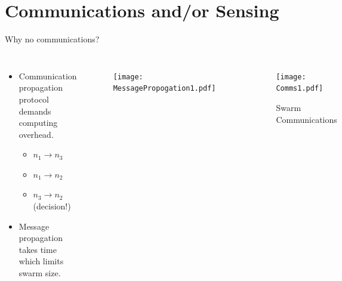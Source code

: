 \documentclass{beamer}
\begin{document}
\section{Communications and/or Sensing}
\begin{frame}{Why no communications?}
  
  \begin{columns}
      \begin{itemize}
        \item {
          Communication propagation protocol demands computing overhead.
          \begin{itemize}
            \item $n_1 \rightarrow n_3$
            \item $n_1 \rightarrow n_2$
            \item $n_3 \rightarrow n_2$ (decision!) 
          \end{itemize}
        }
        \item {   
          Message propagation takes time which limits swarm size.
        }
      \end{itemize}
      \begin{figure}
        \begin{center}
          \texttt{[image: MessagePropogation1.pdf]}
        \end{center}
      \end{figure}
      \begin{figure}
        \begin{center}
          \texttt{[image: Comms1.pdf]}
        \end{center}
        \caption{Swarm Communications}
      \end{figure}
    \end{columns}
\end{frame}

\end{document}
